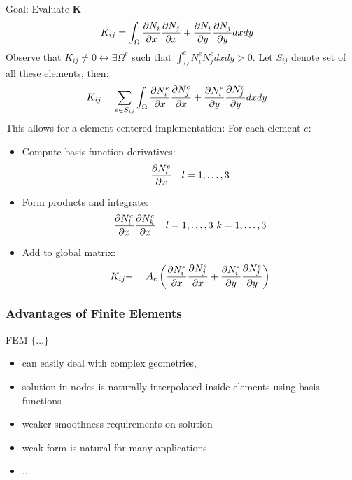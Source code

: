 \begin{multicols}{2}
Goal: Evaluate $\mathbf K$
\begin{align*}
	K_{ij} &= \int_\Omega {\partial N_i \over \partial x} {\partial N_j \over \partial x} + {\partial N_i \over \partial y} {\partial N_j \over \partial y} dx dy
\end{align*}
Observe that $K_{ij} \neq 0 \leftrightarrow \exists \Omega^e$ such that $\int_\Omega^e N_i^e N_j^e dxdy > 0$. Let $S_{ij}$ denote set of all these elements, then:
\begin{align*}
	K_{ij} &= \sum_{e \in S_{ij}} \int_\Omega {\partial N_i^e \over \partial x} {\partial N_j^e \over \partial x} 
	+ {\partial N_i^e \over \partial y} {\partial N_j^e \over \partial y} dx dy
\end{align*}
This allows for a element-centered implementation: For each element $e$:
\begin{itemize}
	\item Compute basis function derivatives: 
		\begin{align*}
			&{\partial N_l^e \over \partial x}&l=1,\ldots, 3
		\end{align*}
	\item Form products and integrate:
		\begin{align*}
			&{\partial N_l^e \over \partial x}{\partial N_k^e \over \partial x}&l=1,\ldots, 3\ k=1,\ldots, 3
		\end{align*}
	\item Add to global matrix:
		\begin{align*}
		K_{ij} +=  A_e \left( {\partial N_i^e \over \partial x} {\partial N_j^e \over \partial x} 
	+ {\partial N_i^e \over \partial y} {\partial N_j^e \over \partial y} \right)		\end{align*}
\end{itemize}

\subsubsection{Advantages of Finite Elements}
FEM $\{\ldots\}$
\begin{itemize}
	\item can easily deal with complex geometries,
	\item solution in nodes is naturally interpolated inside elements using basis functions
	\item weaker smoothness requirements on solution
	\item weak form is natural for many applications
	\item $\ldots$
\end{itemize}











\end{multicols}